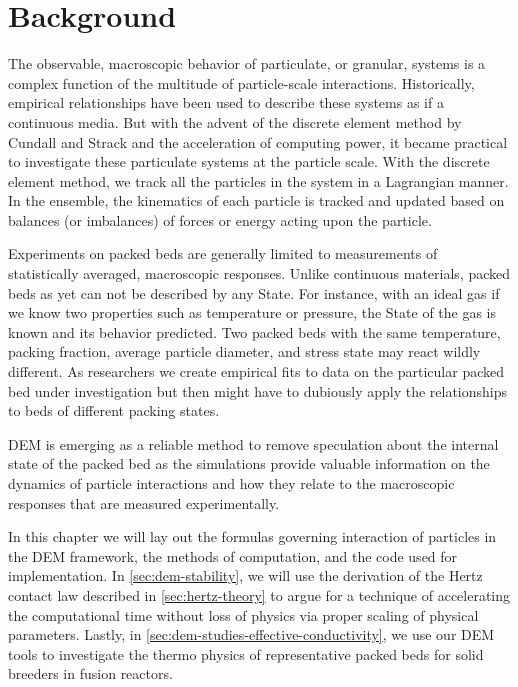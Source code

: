 \section{Background}
\label{sec:dem-intro}

The observable, macroscopic behavior of particulate, or granular, systems is a complex function of the multitude of particle-scale interactions. Historically, empirical relationships have been used to describe these systems as if a continuous media. But with the advent of the discrete element method by Cundall and Strack\cite{Cundall1979} and the acceleration of computing power, it became practical to investigate these particulate systems at the particle scale. With the discrete element method, we track all the particles in the system in a Lagrangian manner. In the ensemble, the kinematics of each particle is tracked and updated based on balances (or imbalances) of forces or energy acting upon the particle.

Experiments on packed beds are generally limited to measurements of statistically averaged, macroscopic responses. Unlike continuous materials, packed beds as yet can not be described by any State. For instance, with an ideal gas if we know two properties such as temperature or pressure, the State of the gas is known and its behavior predicted. Two packed beds with the same temperature, packing fraction, average particle diameter, and stress state may react wildly different. As researchers we create empirical fits to data on the particular packed bed under investigation but then might have to dubiously apply the relationships to beds of different packing states. 

DEM is emerging as a reliable method to remove speculation about the internal state of the packed bed as the simulations provide valuable information on the dynamics of particle interactions and how they relate to the macroscopic responses that are measured experimentally.

In this chapter we will lay out the formulas governing interaction of particles in the DEM framework, the methods of computation, and the code used for implementation. In \cref{sec:dem-stability}, we will use the derivation of the Hertz contact law described in \cref{sec:hertz-theory} to argue for a technique of accelerating the computational time without loss of physics via proper scaling of physical parameters. Lastly, in \cref{sec:dem-studies-effective-conductivity}, we use our DEM tools to investigate the thermo physics of representative packed beds for solid breeders in fusion reactors.
